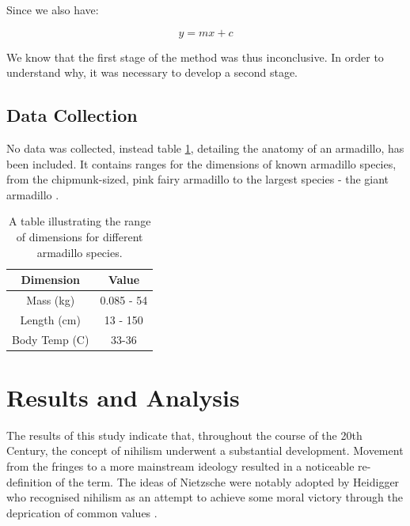 \documentclass[a4paper, 10pt]{IEEEtran}
\begin{document}
Since we also have:

\[
y = mx + c
\]

We know that the first stage of the method was thus inconclusive. In order to understand why, it was necessary to develop a second stage.

\subsection{Data Collection}
\label{sub:datacollection}

No data was collected, instead table \ref{tab:armadillo}, %
detailing the anatomy of an armadillo, has been included. It contains ranges for the dimensions of known armadillo species, from the chipmunk-sized, pink fairy armadillo to the largest species - the giant armadillo \cite{WikAr}.

\begin{center} %
	\begin{minipage}{.7\linewidth} %
	\begin{table}[H]
		\centering %
		\renewcommand{\arraystretch}{1.3} %
		\caption{A table illustrating the range of dimensions for different armadillo species.}
		\label{tab:armadillo}
		\begin{tabular}{c | c} %
			Dimension & Value \\ \hline \hline %
			Mass (kg) & 0.085 - 54 \\ \hline
			Length (cm) & 13 - 150 \\ \hline
			Body Temp (\textdegree C) & 33-36 \\ \hline
		\end{tabular}
	\end{table}
	\end{minipage}
\end{center}

\section{Results and Analysis}
\label{sec:resultsanalysis}

The results of this study indicate that, throughout the course of the 20th Century, the concept of nihilism underwent a substantial development. Movement from the fringes to a more mainstream ideology resulted in a noticeable re-definition of the term. The ideas of Nietzsche were notably adopted by Heidigger who recognised nihilism as an attempt to achieve some moral victory through the deprication of common values \cite{WikMH}. \par
\end{document}
